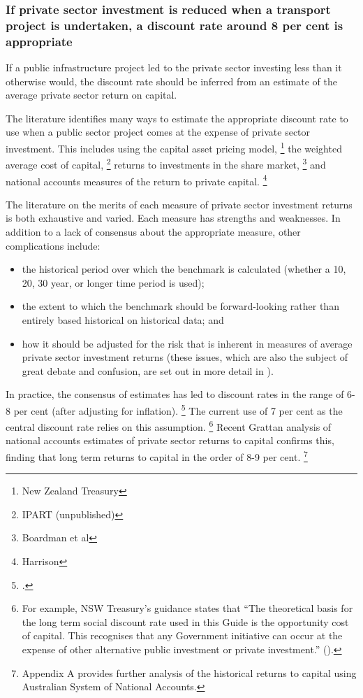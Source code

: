\subsubsection{If private sector investment is reduced when a transport project is undertaken, a discount rate around 8 per cent is appropriate}

If a public infrastructure project led to the private sector investing less than it otherwise would, the discount rate should be inferred from an estimate of the average private sector return on capital. 

The literature identifies many ways to estimate the appropriate discount rate to use when a public sector project comes at the expense of private sector investment. This includes using the capital asset pricing model,%
    \footnote{New Zealand Treasury}
the weighted average cost of capital,%
    \footnote{IPART (unpublished)}
returns to investments in the share market,%
    \footnote{Boardman et al}
and national accounts measures of the return to private capital.%
    \footnote{Harrison}

The literature on the merits of each measure of private sector investment returns is both exhaustive and varied. Each measure has strengths and weaknesses. In addition to a lack of consensus about the appropriate measure, other complications include: 
\begin{itemize}
    \item the historical period over which the benchmark is calculated (whether a 10, 20, 30 year, or longer time period is used); 
    \item the extent to which the benchmark should be forward-looking rather than entirely based historical on historical data; and 
    \item how it should be adjusted for the risk that is inherent in measures of average private sector investment returns (these issues, which are also the subject of great debate and confusion, are set out in more detail in ).
\end{itemize}
    
In practice, the consensus of estimates has led to discount rates in the range of 6-8 per cent (after adjusting for inflation).%
    \footcite[][5]{Argyrous-ANZSOG-review-of-CBA-guidelines}
The current use of 7 per cent as the central discount rate relies on this assumption.%
    \footnote{For example, NSW Treasury's guidance states that ``The theoretical basis for the long term social discount rate used in this Guide is the opportunity cost of capital. This recognises that any Government initiative can occur at the expense of other alternative public investment or private investment.'' (\textcite{New-South-Wales-Treasury-2017-CBA-Guidelines}).}
Recent Grattan analysis of national accounts estimates of private sector returns to capital confirms this, finding that long term returns to capital in the order of 8-9 per cent.%
    \footnote{Appendix A provides further analysis of the historical returns to capital using Australian System of National Accounts.}


